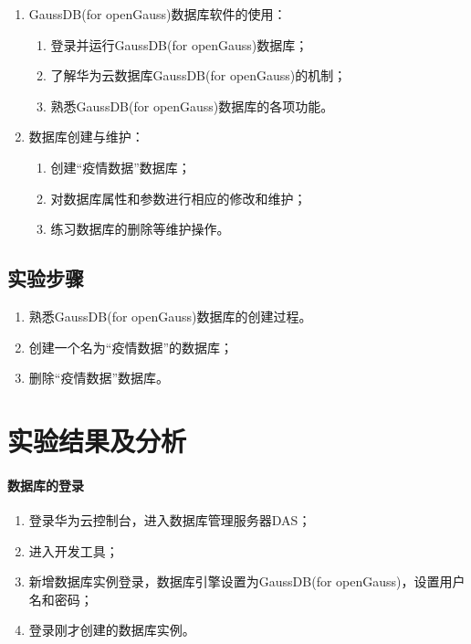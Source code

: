 \documentclass[lang=cn,11pt,a4paper,cite=authornum]{paper}
\begin{document}
\begin{enumerate}
    \item GaussDB(for openGauss)数据库软件的使用：
          \begin{enumerate}
              \item 登录并运行GaussDB(for openGauss)数据库；
              \item 了解华为云数据库GaussDB(for openGauss)的机制；
              \item 熟悉GaussDB(for openGauss)数据库的各项功能。
          \end{enumerate}
    \item 数据库创建与维护：
          \begin{enumerate}
              \item 创建“疫情数据”数据库；
              \item 对数据库属性和参数进行相应的修改和维护；
              \item 练习数据库的删除等维护操作。
          \end{enumerate}
\end{enumerate}

\subsection{实验步骤}

\begin{enumerate}
    \item 熟悉GaussDB(for openGauss)数据库的创建过程。
    \item 创建一个名为“疫情数据”的数据库；
    \item 删除“疫情数据”数据库。
\end{enumerate}

\section{实验结果及分析}

\paragraph{数据库的登录}

\begin{enumerate}
    \item 登录华为云控制台，进入数据库管理服务器DAS；
    \item 进入开发工具；
    \item 新增数据库实例登录，数据库引擎设置为GaussDB(for openGauss)，设置用户名和密码；
    \item 登录刚才创建的数据库实例。
\end{enumerate}
\end{document}
